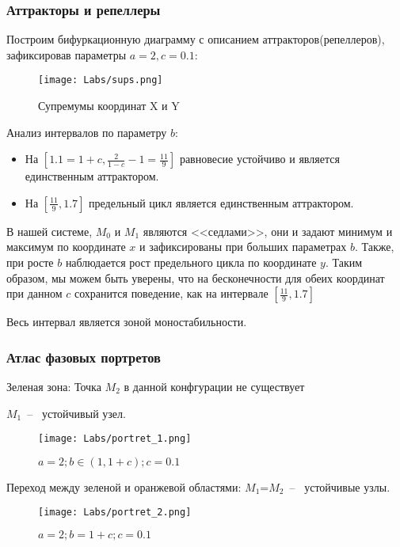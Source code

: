 \documentclass[a4paper,14pt]{extarticle}
\begin{document}
\newpage
\subsubsection{Аттракторы и репеллеры}
Построим бифуркационную диаграмму с описанием аттракторов(репеллеров), зафиксировав параметры $a=2, c=0.1$:


\begin{figure}[!h]
\centering
\texttt{[image: Labs/sups.png]}
\caption{Супремумы координат
X и Y}
\label{attr_repell}
\end{figure}

Анализ интервалов по параметру $b$:
\begin{itemize}
\item На $[1.1 = 1 + c, \frac{2}{1 - c}-1 = \frac{11}{9}]$ равновесие устойчиво и является единственным аттрактором.
\item На $[\frac{11}{9}, 1.7]$ предельный цикл является единственным аттрактором.
\end{itemize}

В нашей системе, $M_0$ и $M_1$ являются <<седлами>>, они и задают минимум и максимум по координате $x$ и зафиксированы при больших параметрах $b$. Также, при росте $b$ наблюдается рост предельного цикла по координате $y$. Таким образом, мы можем быть уверены, что на бесконечности для обеих координат при данном $c$ сохранится поведение, как на интервале $[\frac{11}{9}, 1.7]$

Весь интервал является зоной моностабильности.

\newpage
\subsubsection{Атлас фазовых портретов}

Зеленая зона:
Точка $M_2$ в данной конфгурации не существует

$M_1$~--~ устойчивый узел.
\begin{figure}[!h]
\centering
\texttt{[image: Labs/portret\_1.png]}
\caption{$a = 2;b \in (1, 1 + c);c = 0.1$}
\label{prt1}
\end{figure}

\newpage
Переход между зеленой и оранжевой областями:
$M_1$=$M_2$~--~ устойчивые узлы.
\begin{figure}[!h]
\centering
\texttt{[image: Labs/portret\_2.png]}
\caption{$a = 2;b = 1 + c;c = 0.1$}
\label{prt2}
\end{figure}
\end{document}
